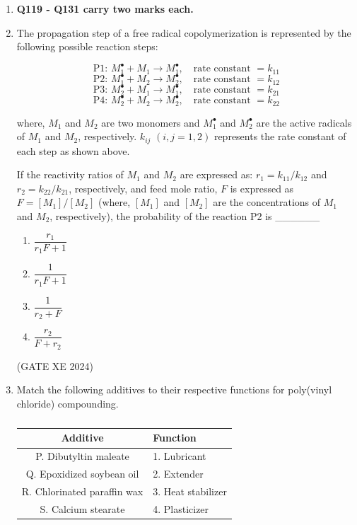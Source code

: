 \documentclass[12pt]{article}
\begin{document}
\begin{enumerate}
(GATE XE 2024)
\item[] \textbf{Q119 - Q131 carry two marks each.}
\item The propagation step of a free radical copolymerization is represented by the following possible reaction steps:  

$$
\text{P1: } M_1^{\bullet} + M_1 \rightarrow M_1^{\bullet}, \quad \text{rate constant } = k_{11}
$$  
$$
\text{P2: } M_1^{\bullet} + M_2 \rightarrow M_2^{\bullet}, \quad \text{rate constant } = k_{12}
$$  
$$
\text{P3: } M_2^{\bullet} + M_1 \rightarrow M_1^{\bullet}, \quad \text{rate constant } = k_{21}
$$  
$$
\text{P4: } M_2^{\bullet} + M_2 \rightarrow M_2^{\bullet}, \quad \text{rate constant } = k_{22}
$$  

where, $M_1$ and $M_2$ are two monomers and $M_1^{\bullet}$ and $M_2^{\bullet}$ are the active radicals of $M_1$ and $M_2$, respectively. $k_{ij}$ $(i,j=1,2)$ represents the rate constant of each step as shown above.  

If the reactivity ratios of $M_1$ and $M_2$ are expressed as: $r_1 = k_{11}/k_{12}$ and $r_2 = k_{22}/k_{21}$, respectively, and feed mole ratio, $F$ is expressed as $F = [M_1]/[M_2]$ (where, $[M_1]$ and $[M_2]$ are the concentrations of $M_1$ and $M_2$, respectively), the probability of the reaction P2 is \_\_\_\_\_\_

\begin{enumerate}
\item $\dfrac{r_1}{r_1 F + 1}$  
\item $\dfrac{1}{r_1 F + 1}$  
\item $\dfrac{1}{r_2 + F}$  
\item $\dfrac{r_2}{F + r_2}$  
\end{enumerate}  

(GATE XE 2024)

\item Match the following additives to their respective functions for poly(vinyl chloride) compounding.  

\begin{table}[H]
\centering
\caption{}
\label{}
\begin{tabular}{|c|l|}
\hline
\textbf{Additive} & \textbf{Function} \\
\hline
P. Dibutyltin maleate & 1. Lubricant \\
Q. Epoxidized soybean oil & 2. Extender \\
R. Chlorinated paraffin wax & 3. Heat stabilizer \\
S. Calcium stearate & 4. Plasticizer \\
\hline
\end{tabular}
\end{table}


\end{enumerate}
\end{document}
